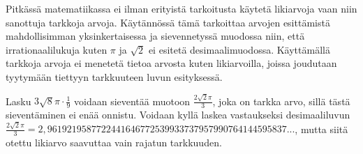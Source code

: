 Pitkässä matematiikassa ei ilman erityistä tarkoitusta käytetä likiarvoja vaan niin sanottuja tarkkoja arvoja. Käytännössä tämä tarkoittaa arvojen esittämistä mahdollisimman yksinkertaisessa ja sievennetyssä muodossa niin, että irrationaalilukuja kuten $\pi$ ja $\sqrt{2}$ ei esitetä desimaalimuodossa. Käyttämällä tarkkoja arvoja ei menetetä tietoa arvosta kuten likiarvoilla, joissa joudutaan tyytymään tiettyyn tarkkuuteen luvun esityksessä.

\begin{esimerkki}
Lasku $3\sqrt{8}\pi \cdot \frac{1}{9}$ voidaan sieventää muotoon $\frac{2\sqrt{2}\pi}{3}$, joka on tarkka arvo, sillä tästä sieventäminen ei enää onnistu. Voidaan kyllä laskea vastaukseksi desimaaliluvun $\frac{2\sqrt{2}\pi}{3}=2,9619219587722441646772539933737957990764144595837...$, mutta siitä otettu likiarvo saavuttaa vain rajatun tarkkuuden. 
\end{esimerkki}





